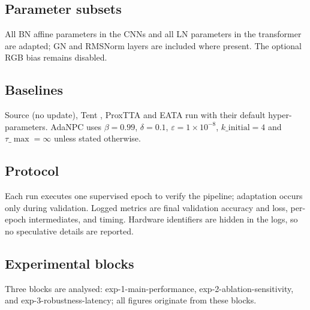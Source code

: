 \documentclass{article} %
\begin{document}
\subsection{Parameter subsets}
All BN affine parameters in the CNNs and all LN parameters in the transformer are adapted; GN and RMSNorm layers are included where present. The optional RGB bias remains disabled.
\subsection{Baselines}
Source (no update), Tent \cite{wang-2020-tent}, ProxTTA and EATA run with their default hyper-parameters. AdaNPC uses \(\beta=0.99\), \(\delta=0.1\), \(\varepsilon=1\times 10^{-8}\), \(k\_{\mathrm{initial}}=4\) and \(\tau\_{\max}=\infty\) unless stated otherwise.
\subsection{Protocol}
Each run executes one supervised epoch to verify the pipeline; adaptation occurs only during validation. Logged metrics are final validation accuracy and loss, per-epoch intermediates, and timing. Hardware identifiers are hidden in the logs, so no speculative details are reported.
\subsection{Experimental blocks}
Three blocks are analysed: exp-1-main-performance, exp-2-ablation-sensitivity, and exp-3-robustness-latency; all figures originate from these blocks.
\end{document}
